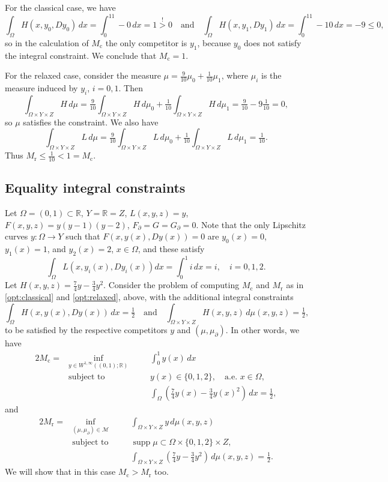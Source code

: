 \documentclass{article}
\newcommand{\R}{\mathbb{R}}
\theoremstyle{definition}
\theoremstyle{remark}
\begin{document}
 For the classical case, we have
 \[\int_{\Omega}H(x,y_0,Dy_0)\,dx=\int_0^11-0\,dx=1\stackrel{!}>0\quad\textrm{and}\quad\int_{\Omega}H(x,y_1,Dy_1)\,dx=\int_0^11-10\,dx=-9\leq 0,\]
 so in the calculation of $M_\mathrm{c}$ the only competitor is $y_1$, because $y_0$ does not satisfy the integral constraint. We conclude that $M_\mathrm{c}=1$.
 
 For the relaxed case, consider the measure  $\mu=\frac9{10}\mu_0+\frac1{10}\mu_1$, where $\mu_i$ is the measure induced by $y_i$, $i=0,1$. Then 
 \[\int_{\Omega\times Y\times Z}H\,d\mu=\tfrac9{10}\int_{\Omega\times Y\times Z}H\,d\mu_0+\tfrac1{10}\int_{\Omega\times Y\times Z}H\,d\mu_1=\tfrac{9}{10}-9\tfrac1{10}=0,\]
 so  $\mu$ satisfies the constraint. We also have
 \[\int_{\Omega\times Y\times Z}L\,d\mu=\tfrac9{10}\int_{\Omega\times Y\times Z}L\,d\mu_0+\tfrac1{10}\int_{\Omega\times Y\times Z}L\,d\mu_1=\tfrac1{10}.\]
 Thus $M_\mathrm{r}\leq \frac1{10}<1=M_\mathrm{c}$.

\subsection{Equality integral constraints}

Let $\Omega=(0,1)\subset\R$, $Y=\R=Z$, $L(x,y,z)=y$, $F(x,y,z)=y(y-1)(y-2)$, $F_\partial=G=G_\partial=0$. Note that the only Lipschitz curves $y\colon\Omega\to Y$  such that $F(x,y(x),Dy(x))=0$ are $y_0(x)=0$, $y_1(x)=1$, and $y_2(x)=2$, $x\in\Omega$, and these satisfy
 \[\int_{\Omega}L(x,y_i(x),Dy_i(x))dx=\int_0^1i\,dx=i,\quad i=0,1,2.\]
 Let $H(x,y,z)=\frac74y-\frac34y^2$. Consider the problem of computing $M_\mathrm{c}$ and $M_\mathrm{r}$ as in \eqref{opt:classical} and \eqref{opt:relaxed}, above, with the additional integral constraints
 \[\int_\Omega H(x,y(x),Dy(x))\,dx= \tfrac12\quad\textrm{and}\quad \int_{\Omega\times Y\times Z}H(x,y,z)\,d\mu(x,y,z)=\tfrac12,\]
 to be satisfied by the respective competitors $y$ and $(\mu,\mu_\partial)$. In other words, we have
\begin{alignat*}{2}
 M_\mathrm{c}= &\!\inf\limits_{y \in W^{1,\infty}((0,1);\R)}  &\quad &\displaystyle\int_0^1 y(x)\, dx \\ 
 &\textrm{subject to}& & y(x)\in\{ 0,1,2\},\quad \text{a.e. }x\in \Omega,\nonumber \\
 &&& \textstyle\int_\Omega (\tfrac74y(x)-\tfrac34y(x)^2)\,dx=\tfrac12,
\end{alignat*}
 and
 \begin{alignat*}{2}
 M_\mathrm{r}=&\!\inf\limits_{(\mu,\mu_\partial)\in \mathcal M}  &\quad&\displaystyle\int_{\Omega\times Y\times Z} y\, d\mu(x,y,z) \\ 
 &\textrm{subject to} %
&& \operatorname{supp}\mu\subset \Omega\times \{0,1,2\}\times Z,\nonumber\\ 
&&&\textstyle\int_{\Omega\times Y\times Z}(\tfrac74y-\tfrac34y^2)\,d\mu(x,y,z)=\tfrac12.
%
%
\end{alignat*}
We will show that in this case $M_\mathrm{c}>M_\mathrm{r}$ too.
 
\end{document}

